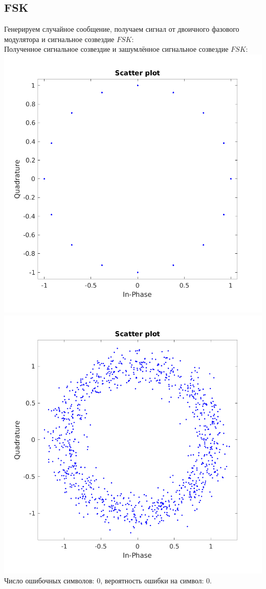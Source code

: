 \documentclass[a4paper]{article}
\begin{document}
\subsection{FSK}
Генерируем случайное сообщение, получаем сигнал от двоичного фазового модулятора и сигнальное созвездие $FSK$:
\\
Полученное сигнальное созвездие и зашумлённое сигнальное созвездие $FSK$:\\
\includegraphics[scale=0.4]{lab6/figures/figure_10.png}
\includegraphics[scale=0.4]{lab6/figures/figure_11.png}\\
Число ошибочных символов: 0, вероятность ошибки на символ: 0.
\end{document}
